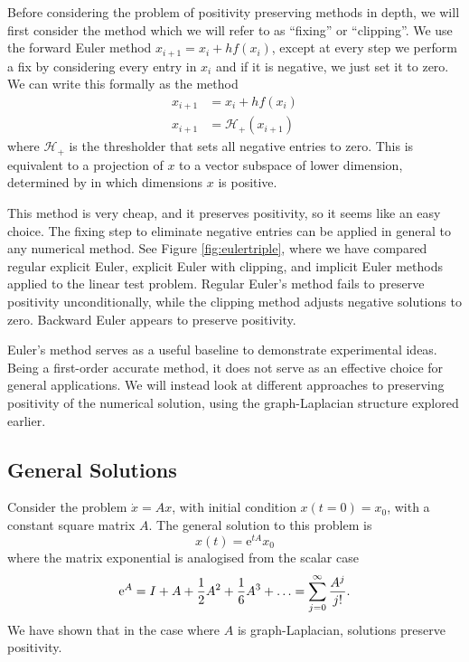 Before considering the problem of positivity preserving methods in depth, we will first consider the method which we will refer to as ``fixing'' or ``clipping''.
We use the forward Euler method $x_{i+1} = x_i + hf(x_i)$, except at every step we perform a fix by considering every entry in $x_i$ and if it is negative, we just set it to zero.
We can write this formally as the method
\begin{align*}
    x_{i+1} &= x_i + h f(x_i) \\
    x_{i+1} &= \mathcal{H}_+(x_{i+1}) 
\end{align*}
where $\mathcal{H}_+$ is the thresholder that sets all negative entries to zero.
This is equivalent to a projection of $x$ to a vector subspace of lower dimension, determined by in which dimensions $x$ is positive.

This method is very cheap, and it preserves positivity, so it seems like an easy choice.
The fixing step to eliminate negative entries can be applied in general to any numerical method.
See Figure \ref{fig:eulertriple}, where we have compared regular explicit Euler, explicit Euler with clipping, and implicit Euler methods applied to the linear test problem.
Regular Euler's method fails to preserve positivity unconditionally, while the clipping method adjusts negative solutions to zero.
Backward Euler appears to preserve positivity.

Euler's method serves as a useful baseline to demonstrate experimental ideas.
Being a first-order accurate method, it does not serve as an effective choice for general applications.
We will instead look at different approaches to preserving positivity of the numerical solution,
using the graph-Laplacian structure explored earlier.

\subsection{General Solutions}

Consider the problem $\dot{x} = Ax$, with initial condition $x(t=0) = x_0$, with a constant square matrix $A$.
The general solution to this problem is
\begin{equation*}
    x(t) = \mathrm{e}^{tA} x_0
\end{equation*}
where the matrix exponential is analogised from the scalar case
\begin{equation*}
    \mathrm{e}^A = I + A + \frac{1}{2}A^2 + \frac{1}{6}A^3 + \mathellipsis = \sum_{j=0}^{\infty} \frac{A^j}{j!}.
\end{equation*}
We have shown that in the case where $A$ is graph-Laplacian, solutions preserve positivity.

